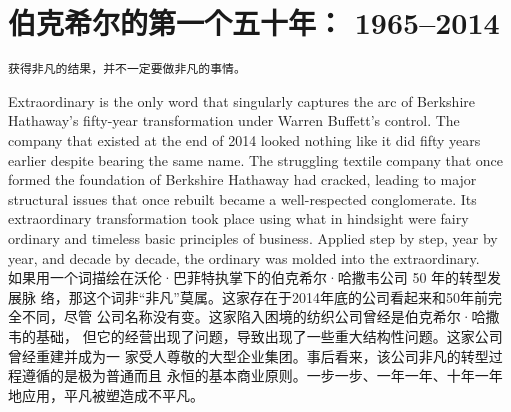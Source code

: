 \chapter{伯克希尔的第一个五十年： 1965--2014}

\texttt{获得非凡的结果，并不一定要做非凡的事情。}

\begin{verseparallel}
  {
    \noindent Extraordinary is the only word that singularly captures the arc of
    Berkshire Hathaway’s fifty-year transformation under Warren Buffett’s
    control. The company that existed at the end of 2014 looked nothing like it
    did fifty years earlier despite bearing the same name. The struggling
    textile company that once formed the foundation of Berkshire Hathaway had
    cracked, leading to major structural issues that once rebuilt became a
    well-respected conglomerate. Its extraordinary transformation took place
    using what in hindsight were fairy ordinary and timeless basic principles of
    business. Applied step by step, year by year, and decade by decade, the
    ordinary was molded into the extraordinary. \\
  }
  {
    如果用一个词描绘在沃伦·巴菲特执掌下的伯克希尔·哈撒韦公司 50 年的转型发展脉
    络，那这个词非“非凡”莫属。这家存在于2014年底的公司看起来和50年前完全不同，尽管
    公司名称没有变。这家陷入困境的纺织公司曾经是伯克希尔·哈撒韦的基础，
    但它的经营出现了问题，导致出现了一些重大结构性问题。这家公司曾经重建并成为一
    家受人尊敬的大型企业集团。事后看来，该公司非凡的转型过程遵循的是极为普通而且
    永恒的基本商业原则。一步一步、一年一年、十年一年地应用，平凡被塑造成不平凡。
  }
\end{verseparallel}

